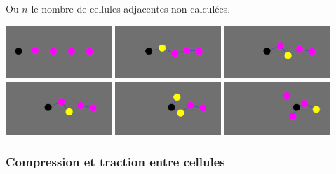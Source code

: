 \documentclass[a4paper,11pt]{article}
\begin{document}
Ou $n$ le nombre de cellules adjacentes non calculées.

\begin{center}
  \includegraphics[width=4cm]{Images/cir_1.png}
  \includegraphics[width=4cm]{Images/cir_2.png}
  \includegraphics[width=4cm]{Images/cir_3.png}
  \includegraphics[width=4cm]{Images/cir_3.png}
  \includegraphics[width=4cm]{Images/cir_4.png}
  \includegraphics[width=4cm]{Images/cir_5.png}    
\end{center}

\subsubsection{Compression et traction entre cellules}
\end{document}
